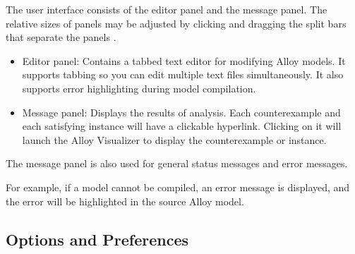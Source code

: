 \documentclass[a4paper,12pt]{report}
\begin{document}
The user interface consists of the editor panel and the message panel. The relative sizes of panels may be adjusted by clicking and dragging the split bars that separate the panels \cite{DanielJackson2004}.
\begin{itemize}
\item 	Editor panel: Contains a tabbed text editor for modifying Alloy models. It supports tabbing so you can edit multiple text files simultaneously. It also supports error highlighting during model compilation.
\item 	Message panel: Displays the results of analysis. Each counterexample and each satisfying instance will have a clickable hyperlink. Clicking on it will launch the Alloy Visualizer to display the counterexample or instance.
\end{itemize}
The message panel is also used for general status messages and error messages.

For example, if a model cannot be compiled, an error message is displayed, and the error will be highlighted in the source Alloy model.

\subsection{Options and Preferences}
\label{Options & Preference}
\end{document}
